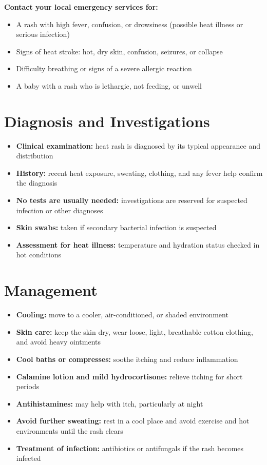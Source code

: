 \textbf{Contact your local emergency services for:}
\begin{itemize}
    \item A rash with high fever, confusion, or drowsiness (possible heat illness or serious infection)
    \item Signs of heat stroke: hot, dry skin, confusion, seizures, or collapse
    \item Difficulty breathing or signs of a severe allergic reaction
    \item A baby with a rash who is lethargic, not feeding, or unwell
\end{itemize}

\section*{Diagnosis and Investigations}
\begin{itemize}
    \item \textbf{Clinical examination:} heat rash is diagnosed by its typical appearance and distribution
    \item \textbf{History:} recent heat exposure, sweating, clothing, and any fever help confirm the diagnosis
    \item \textbf{No tests are usually needed:} investigations are reserved for suspected infection or other diagnoses
    \item \textbf{Skin swabs:} taken if secondary bacterial infection is suspected
    \item \textbf{Assessment for heat illness:} temperature and hydration status checked in hot conditions
\end{itemize}

\section*{Management}
\begin{itemize}
    \item \textbf{Cooling:} move to a cooler, air-conditioned, or shaded environment
    \item \textbf{Skin care:} keep the skin dry, wear loose, light, breathable cotton clothing, and avoid heavy ointments
    \item \textbf{Cool baths or compresses:} soothe itching and reduce inflammation
    \item \textbf{Calamine lotion and mild hydrocortisone:} relieve itching for short periods
    \item \textbf{Antihistamines:} may help with itch, particularly at night
    \item \textbf{Avoid further sweating:} rest in a cool place and avoid exercise and hot environments until the rash clears
    \item \textbf{Treatment of infection:} antibiotics or antifungals if the rash becomes infected
\end{itemize}

